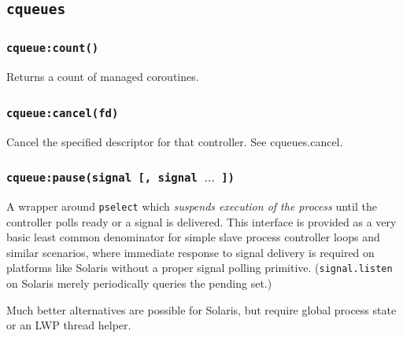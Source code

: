 \documentclass[11pt, oneside]{memoir}
\newcommand*{\cqueues}[0]{\texttt{cqueues}\xspace}
\newcommand*{\syscall}[1]{\texttt{#1}\xspace}
\newcommand*{\routine}[1]{\texttt{#1}\xspace}
\newcounter{toccols}
\newenvironment{Module}[1]{
	\subsection{\texttt{#1}}
	\addtocontents{toc}{
		\protect\begin{multicols}{\value{toccols}}
	}
}{
	\addtocontents{toc}{\protect\end{multicols}}
}
\begin{document}
\begin{Module}{\cqueues}
\subsubsection[\routine{cqueues:count}]{\routine{cqueue:count()}}
Returns a count of managed coroutines.

\subsubsection[\routine{cqueues:cancel}]{\routine{cqueue:cancel(fd)}}
Cancel the specified descriptor for that controller. See cqueues.cancel.

\subsubsection[\routine{cqueues:pause}]{\routine{cqueue:pause(signal [, signal $\ldots$ ])}}
A wrapper around \syscall{pselect} which \emph{suspends execution of the process} until the controller polls ready or a signal is delivered. This interface is provided as a very basic least common denominator for simple slave process controller loops and similar scenarios, where immediate response to signal delivery is required on platforms like Solaris without a proper signal polling primitive. (\routine{signal.listen} on Solaris merely periodically queries the pending set.)

Much better alternatives are possible for Solaris, but require global process state or an LWP thread helper.

\end{Module}
\end{document}
